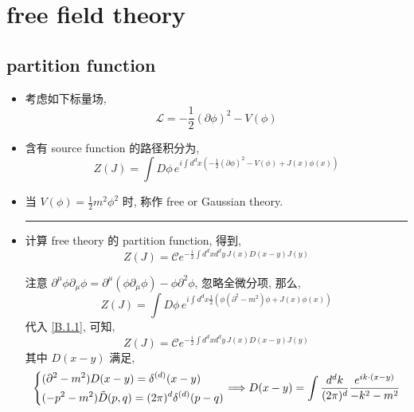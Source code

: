 \chapter{free field theory}
\section{partition function}
\begin{itemize}
	\item 考虑如下标量场,
	\begin{equation}
		\mathcal{L} = - \frac{1}{2} (\partial \phi)^2 - V(\phi)
	\end{equation}
	
	\item 含有 source function 的路径积分为,
	\begin{equation}
		Z(J) = \int D\phi \, e^{i \int d^d x (- \frac{1}{2} (\partial \phi)^2 - V(\phi) + J(x) \phi(x))}
	\end{equation}
	
	\item 当 $V(\phi) = \frac{1}{2} m^2 \phi^2$ 时, 称作 free or Gaussian theory.
	
	\noindent\rule[0.5ex]{\linewidth}{0.5pt} %
	
	\item 计算 free theory 的 partition function, 得到,
	\begin{equation}
		Z(J) = \mathcal{C} e^{- \frac{i}{2} \int d^d x d^d y \, J(x) D(x - y) J(y)}
	\end{equation}
	
	\begin{tcolorbox}[title=proof:]
		注意 $\partial^\mu \phi \partial_\mu \phi = \partial^\mu(\phi \partial_\mu \phi) - \phi \partial^2 \phi$, 忽略全微分项, 那么,
		\begin{equation} \label{1.1.4}
			Z(J) = \int D\phi \, e^{i \int d^d x \frac{1}{2} (\phi (\partial^2 - m^2) \phi + J(x) \phi(x))}
		\end{equation}
		代入 \eqref{B.1.1}, 可知,
		\begin{equation}
			Z(J) = \mathcal{C} e^{- \frac{i}{2} \int d^d x d^d y \, J(x) D(x - y) J(y)}
		\end{equation}
		其中 $D(x - y)$ 满足,
		\begin{equation} \label{1.1.6}
			\begin{dcases}
				(\partial^2 - m^2) D(x - y) = \delta^{(d)}(x - y) \\
				(- p^2 - m^2) \tilde{D}(p, q) = (2 \pi)^d \delta^{(d)}(p - q)
			\end{dcases} \Longrightarrow D(x - y) = \int \frac{d^d k}{(2 \pi)^d} \frac{e^{i k \cdot (x - y)}}{- k^2 - m^2}
		\end{equation}
	\end{tcolorbox}
\end{itemize}


